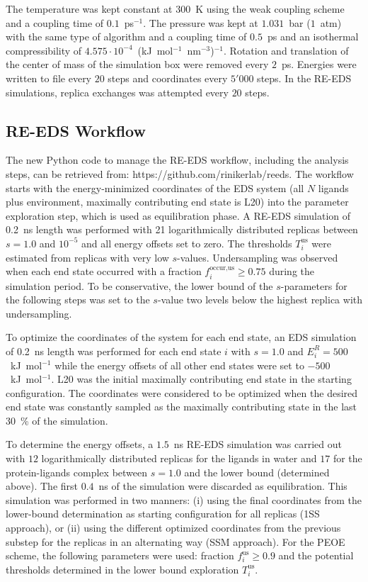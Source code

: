 The temperature was kept constant at $300$~K using the weak coupling scheme \cite{Berendsen1984} and a coupling time of $0.1$~ps$^{-1}$. The pressure was kept at $1.031$~bar ($1$~atm) with the same type of algorithm and a coupling time of $0.5$~ps and an isothermal compressibility of $4.575 \cdot 10^{-4}$~(kJ~mol$^{-1}$~nm$^{-3}$)$^{-1}$.
Rotation and translation of the center of mass of the simulation box were removed every $2$~ps. 
Energies were written to file every $20$ steps and coordinates every $5'000$ steps.
In the RE-EDS simulations, replica exchanges was attempted every $20$ steps.

\subsection{RE-EDS Workflow}
The new Python code to manage the RE-EDS workflow, including the analysis steps, can be retrieved from: https://github.com/rinikerlab/reeds.
The workflow starts with the energy-minimized coordinates of the EDS system (all $N$ ligands plus environment, maximally contributing end state is L20) into the parameter exploration step, which is used as equilibration phase.
A RE-EDS simulation of 0.2~ns length was performed with 21 logarithmically distributed replicas between $s=1.0$ and $10^{-5}$ and all energy offsets set to zero.  
The thresholds $T_{i}^{\text{us}}$ were estimated from replicas with very low $s$-values.
Undersampling was observed when each end state occurred with a fraction $f_{i}^{\text{occur,us}} \ge 0.75$ during the simulation period.
To be conservative, the lower bound of the $s$-parameters for the following steps was set to the $s$-value two levels below the highest replica with undersampling.

To optimize the coordinates of the system for each end state, an EDS simulation of 0.2~ns length was performed for each end state $i$ with $s=1.0$ and $E^R_i=500$~kJ~mol$^{-1}$ while the energy offsets of all other end states were set to $-500$~kJ~mol$^{-1}$. L20 was the initial maximally contributing end state in the starting configuration. 
The coordinates were considered to be optimized when the desired end state was constantly sampled as the maximally contributing state in the last 30~\% of the simulation. 

To determine the energy offsets, a $1.5$~ns RE-EDS simulation was carried out with $12$ logarithmically distributed replicas for the ligands in water and $17$ for the protein-ligands complex between $s=1.0$ and the lower bound (determined above). The first $0.4$~ns of the simulation were discarded as equilibration. This simulation was performed in two manners: (i) using the final coordinates from the lower-bound determination as starting configuration for all replicas (1SS approach), or (ii) using the different optimized coordinates from the previous substep for the replicas in an alternating way (SSM approach). 
For the PEOE \cite{Sidler2016} scheme, the following parameters were used: fraction $f_{i}^{\text{us}} \ge 0.9$ and the potential thresholds determined in the lower bound exploration $T_{i}^{\text{us}}$.

